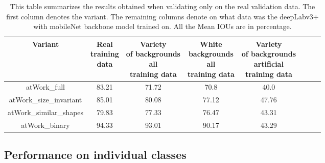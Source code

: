 \begin{table}[!htb]
	\centering
	\begin{tabular}{|c|c|c|c|c|c|c|c|}
	\hline 
    Variant & \makecell{Real \\training \\data} & \makecell{Variety\\ of backgrounds\\ all \\training data} & \makecell{White \\backgrounds\\ all \\training data} & \makecell{Variety\\ of backgrounds\\ artificial \\training data} \\ 
	\hline 
	atWork\_full & 83.21 & 71.72 & 70.8 & 40.0 \\ 
	\hline 
	atWork\_size\_invariant & 85.01 & 80.08 & 77.12 & 47.76 \\ 
	\hline 
	atWork\_similar\_shapes & 79.83 & 77.33 & 76.47 & 43.31 \\ 
	\hline 
	atWork\_binary & 94.33 & 93.01 & 90.17 & 43.29 \\ 
	\hline 
	\end{tabular}
	\caption{This table summarizes the results obtained when validating only on the real validation data. The first column denotes the variant. The remaining columns denote on what data was the deepLabv3+ with mobileNet backbone model trained on. All the Mean IOUs are in percentage.} 
	\label{Table:realval}
\end{table}

\subsection{Performance on individual classes}


